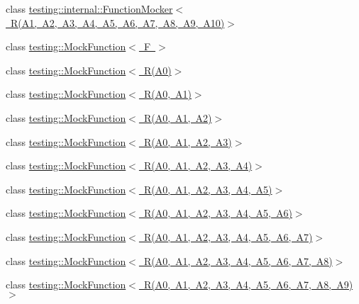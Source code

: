 \begin{DoxyCompactItemize}
\item 
class \mbox{\hyperlink{classtesting_1_1internal_1_1_function_mocker_3_01_r_07_a1_00_01_a2_00_01_a3_00_01_a4_00_01_a5_0038b5baf41d3183579372e0e15a9db969}{testing\+::internal\+::\+Function\+Mocker$<$ R(\+A1, A2, A3, A4, A5, A6, A7, A8, A9, A10)$>$}}
\item 
class \mbox{\hyperlink{classtesting_1_1_mock_function}{testing\+::\+Mock\+Function$<$ F $>$}}
\item 
class \mbox{\hyperlink{classtesting_1_1_mock_function_3_01_r_07_a0_08_4}{testing\+::\+Mock\+Function$<$ R(\+A0)$>$}}
\item 
class \mbox{\hyperlink{classtesting_1_1_mock_function_3_01_r_07_a0_00_01_a1_08_4}{testing\+::\+Mock\+Function$<$ R(\+A0, A1)$>$}}
\item 
class \mbox{\hyperlink{classtesting_1_1_mock_function_3_01_r_07_a0_00_01_a1_00_01_a2_08_4}{testing\+::\+Mock\+Function$<$ R(\+A0, A1, A2)$>$}}
\item 
class \mbox{\hyperlink{classtesting_1_1_mock_function_3_01_r_07_a0_00_01_a1_00_01_a2_00_01_a3_08_4}{testing\+::\+Mock\+Function$<$ R(\+A0, A1, A2, A3)$>$}}
\item 
class \mbox{\hyperlink{classtesting_1_1_mock_function_3_01_r_07_a0_00_01_a1_00_01_a2_00_01_a3_00_01_a4_08_4}{testing\+::\+Mock\+Function$<$ R(\+A0, A1, A2, A3, A4)$>$}}
\item 
class \mbox{\hyperlink{classtesting_1_1_mock_function_3_01_r_07_a0_00_01_a1_00_01_a2_00_01_a3_00_01_a4_00_01_a5_08_4}{testing\+::\+Mock\+Function$<$ R(\+A0, A1, A2, A3, A4, A5)$>$}}
\item 
class \mbox{\hyperlink{classtesting_1_1_mock_function_3_01_r_07_a0_00_01_a1_00_01_a2_00_01_a3_00_01_a4_00_01_a5_00_01_a6_08_4}{testing\+::\+Mock\+Function$<$ R(\+A0, A1, A2, A3, A4, A5, A6)$>$}}
\item 
class \mbox{\hyperlink{classtesting_1_1_mock_function_3_01_r_07_a0_00_01_a1_00_01_a2_00_01_a3_00_01_a4_00_01_a5_00_01_a6_00_01_a7_08_4}{testing\+::\+Mock\+Function$<$ R(\+A0, A1, A2, A3, A4, A5, A6, A7)$>$}}
\item 
class \mbox{\hyperlink{classtesting_1_1_mock_function_3_01_r_07_a0_00_01_a1_00_01_a2_00_01_a3_00_01_a4_00_01_a5_00_01_a6_00_01_a7_00_01_a8_08_4}{testing\+::\+Mock\+Function$<$ R(\+A0, A1, A2, A3, A4, A5, A6, A7, A8)$>$}}
\item 
class \mbox{\hyperlink{classtesting_1_1_mock_function_3_01_r_07_a0_00_01_a1_00_01_a2_00_01_a3_00_01_a4_00_01_a5_00_01_a654a9d62da83bde10dfec0368733bb48}{testing\+::\+Mock\+Function$<$ R(\+A0, A1, A2, A3, A4, A5, A6, A7, A8, A9)$>$}}
\end{DoxyCompactItemize}
